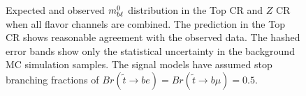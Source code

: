 \begin{figure}[th]
  \centering
  \caption[
    Expected and observed $\MBL^0$ distribution in the Top CR and
    $Z$ CR when all flavor channels are combined.
  ]{
    Expected and observed $\MBL^0$ distribution in the Top CR and
    $Z$ CR when all flavor channels are combined.
    The prediction in the Top CR shows reasonable agreement with the observed
    data.
    The hashed error bands show only the statistical uncertainty in the
    background MC simulation samples.
    The signal models have assumed stop branching fractions of
    $Br(\tilde{t}\rightarrow be) = Br(\tilde{t}\rightarrow b\mu) = 0.5$.
  }
  \label{fig:cr_mbl_0__no_norm_factor}
\end{figure}


